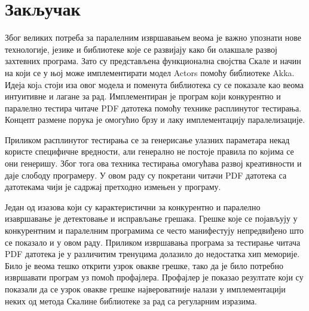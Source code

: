 \documentclass[12pt,oneside]{memoir}
\begin{document}


%



\chapter{Закључак}
\label{chp:zakljucak}


Због великих потреба за паралелним извршавањем веома је важно упознати нове технологије, језике и библиотеке које се развијају како би олакшале развој захтевних програма. Зато су представљена функционална својства Скале и начин на који се у њој може имплементирати модел Actors помоћу библиотеке Akka. Идеја којa стоји иза овог модела и поменута библиотека су се показале као веома интуитивне и лагане за рад. Имплементиран је програм који конкурентно и паралелно тестира читаче PDF датотека помоћу технике расплинутог тестирања. Концепт размене порука је омогућио брзу и лаку имплементацију паралелизације. 

Приликом расплинутог тестирања се за генерисање улазних параметара некад користе специфичне вредности, али генерално не постоје правила по којима се они генеришу. Због тога ова техника тестирања омогућава развој креативности и даје слободу програмеру. У овом раду су покретани читачи PDF датотека са датотекама чији је садржај претходно измењен у програму. 

Један од изазова који су карактеристични за конкурентно и паралелно изавршавање је детектовање и исправљање грешака. Грешке које се појављују у конкурентним и паралелним програмима се често манифестују непредвиђено што се показало и у овом раду. Приликом извршавања програма за тестирање читача PDF датотека је у различитим тренуцима долазило до недостатка хип меморије. Било је веома тешко открити узрок овакве грешке, тако да је било потребно извршавати програм уз помоћ профајлера. Профајлер је показао резултате који су показали да се узрок овакве грешке највероватније налази у имплементацији неких од метода Скалине библиотеке за рад са регуларним изразима.
\end{document}
